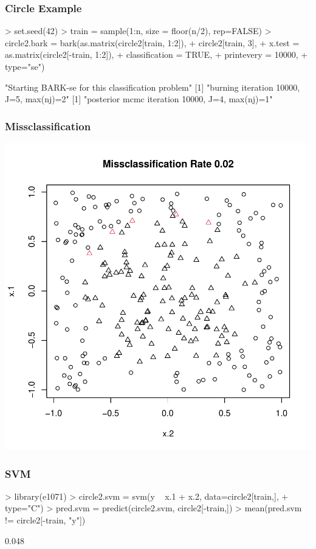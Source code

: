 \documentclass[]{beamer}
\begin{document}
\begin{frame}[fragile] \frametitle{Circle Example}

\begin{Schunk}
\begin{Sinput}
> set.seed(42)
> train = sample(1:n, size = floor(n/2), rep=FALSE)
> circle2.bark = bark(as.matrix(circle2[train, 1:2]),
+                     circle2[train, 3],
+                     x.test = as.matrix(circle2[-train, 1:2]),
+                     classification = TRUE,
+                     printevery = 10000,
+                     type="se")
\end{Sinput}
\begin{Soutput}
[1] "Starting BARK-se for this classification problem"
[1] "burning iteration 10000, J=5, max(nj)=2"
[1] "posterior mcmc iteration 10000, J=4, max(nj)=1"
\end{Soutput}
\end{Schunk}
\end{frame}

\begin{frame}[fragile] \frametitle{Missclassification}
\includegraphics{svm-004}

\end{frame}

\begin{frame}[fragile] \frametitle{SVM}
\begin{Schunk}
\begin{Sinput}
> library(e1071)
> circle2.svm = svm(y ~ x.1 + x.2, data=circle2[train,],
+                   type="C")
> pred.svm = predict(circle2.svm, circle2[-train,])
> mean(pred.svm != circle2[-train, "y"])
\end{Sinput}
\begin{Soutput}
[1] 0.048
\end{Soutput}
\end{Schunk}

\end{frame}
\end{document}
